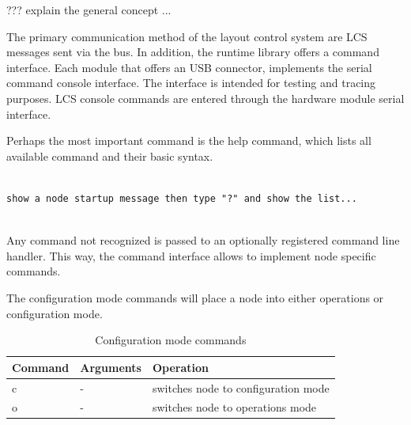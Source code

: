 
???  explain the general concept ...

The primary communication method of the layout control system are LCS messages sent via the bus. In addition, the runtime library offers a command interface. Each module that offers an USB connector, implements the serial command console interface. The interface is intended for testing and tracing purposes. LCS console commands are entered through the hardware module serial interface. 

Perhaps the most important command is the help command, which lists all available command and  their basic syntax.

\lstset{style=codesnippetstyle}
\begin{lstlisting}

show a node startup message then type "?" and show the list...


\end{lstlisting}

Any command not recognized is passed to an optionally registered command line handler. This way, the command interface allows to implement node specific commands.


The configuration mode commands will place a node into either operations or configuration mode.

\begin{table}[ht!]
    \begin{center}
        \renewcommand{\arraystretch}{1.2}
        \caption{Configuration mode commands}
        \begin{tabularx}{0.8\textwidth}{|l|l|X|}
            \hline
            \textbf{Command} & \textbf{Arguments}  & \textbf{Operation} \\
            \hline
            c & - & switches node to configuration mode\\
            \hline
            o & - & switches node to operations mode\\
            \hline
        \end{tabularx}
    \end{center}
\end{table}
\FloatBarrier


